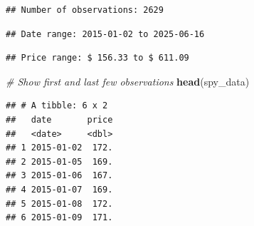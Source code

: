 \documentclass[
]{article}
\newenvironment{Shaded}{\begin{snugshade}}{\end{snugshade}}
\newcommand{\CommentTok}[1]{\textcolor[rgb]{0.56,0.35,0.01}{\textit{#1}}}
\newcommand{\DecValTok}[1]{\textcolor[rgb]{0.00,0.00,0.81}{#1}}
\newcommand{\FunctionTok}[1]{\textcolor[rgb]{0.13,0.29,0.53}{\textbf{#1}}}
\newcommand{\NormalTok}[1]{#1}
\newcommand{\SpecialCharTok}[1]{\textcolor[rgb]{0.81,0.36,0.00}{\textbf{#1}}}
\newcommand{\StringTok}[1]{\textcolor[rgb]{0.31,0.60,0.02}{#1}}
\begin{document}
\begin{verbatim}
## Number of observations: 2629
\end{verbatim}

\begin{Shaded}
\end{Shaded}

\begin{verbatim}
## Date range: 2015-01-02 to 2025-06-16
\end{verbatim}

\begin{Shaded}
\end{Shaded}

\begin{verbatim}
## Price range: $ 156.33 to $ 611.09
\end{verbatim}

\begin{Shaded}
\begin{Highlighting}[]
\CommentTok{\# Show first and last few observations}
\FunctionTok{head}\NormalTok{(spy\_data)}
\end{Highlighting}
\end{Shaded}

\begin{verbatim}
## # A tibble: 6 x 2
##   date       price
##   <date>     <dbl>
## 1 2015-01-02  172.
## 2 2015-01-05  169.
## 3 2015-01-06  167.
## 4 2015-01-07  169.
## 5 2015-01-08  172.
## 6 2015-01-09  171.
\end{verbatim}
\end{document}
